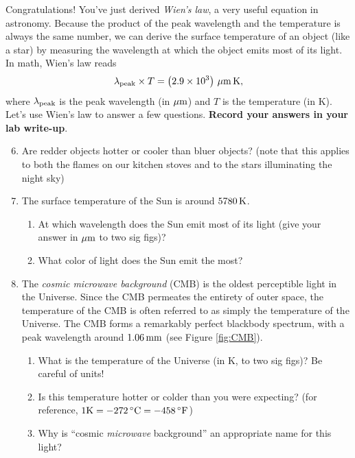 \documentclass[11pt]{article}
\begin{document}
\medskip \noindent
Congratulations! You've just derived \textit{Wien's law}, a very useful equation in astronomy. Because the product of the peak wavelength and the temperature is always the same number, we can derive the surface temperature of an object (like a star) by measuring the wavelength at which the object emits most of its light. In math, Wien's law reads
\begin{equation}
    \lambda_{\rm peak} \times T = \left(2.9 \times 10^3 \right) \, {\rm \mu m \, K},
\end{equation}
where $\lambda_{\rm peak}$ is the peak wavelength (in $\rm \mu m$) and $T$ is the temperature (in K). Let's use Wien's law to answer a few questions. \textbf{Record your answers in your lab write-up}.
\begin{enumerate}
    \setcounter{enumi}{5}
    
    \item Are redder objects hotter or cooler than bluer objects? (note that this applies to both the flames on our kitchen stoves and to the stars illuminating the night sky)
    
    \item The surface temperature of the Sun is around $5780 \, {\rm K}$. 
    \begin{enumerate}
        \item At which wavelength does the Sun emit most of its light (give your answer in $\rm \mu m$ to two sig figs)?
        \item What color of light does the Sun emit the most?
    \end{enumerate} 
    
    \item The \emph{cosmic microwave background} (CMB) is the oldest perceptible light in the Universe. Since the CMB permeates the entirety of outer space, the temperature of the CMB is often referred to as simply the temperature of the Universe. The CMB forms a remarkably perfect blackbody spectrum, with a peak wavelength around $1.06 \, {\rm mm}$ (see Figure \ref{fig:CMB}). 
    \begin{enumerate}
        \item What is the temperature of the Universe (in K, to two sig figs)? Be careful of units!
        
        \item Is this temperature hotter or colder than you were expecting? (for reference, $\rm 1 K = -272 \, ^\circ C = -458 \, ^\circ F$)
        
        \item Why is ``cosmic \emph{microwave} background'' an appropriate name for this light? 
    \end{enumerate}
\end{enumerate}
\end{document}
